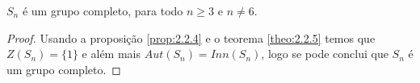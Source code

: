 \begin{theorem}
  $S_n$ é um grupo completo, para todo $n\geq 3$ e $n\neq 6$.
\end{theorem}
\begin{proof} 
  Usando a proposição \ref{prop:2.2.4} e o teorema \ref{theo:2.2.5} temos que $Z(S_n)=\{1\}$ e além mais $Aut(S_n)=Inn(S_n)$, logo se pode conclui que $S_n$ é um grupo completo. 
\end{proof}
